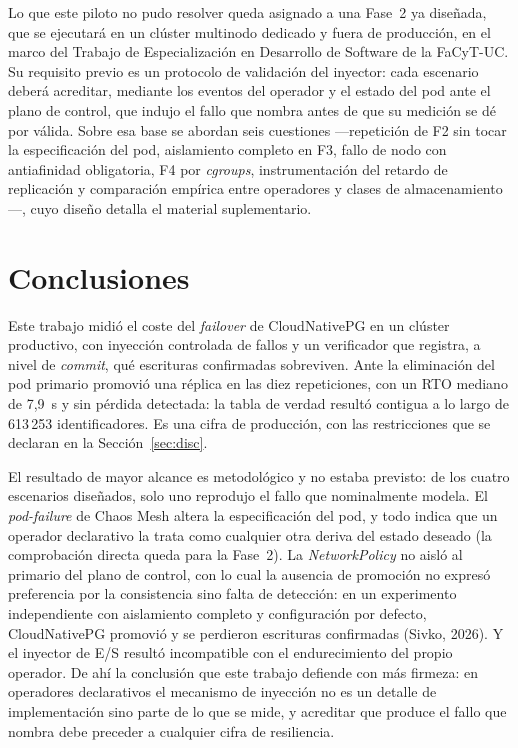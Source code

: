 \documentclass[12pt,twocolumn,letterpaper]{article}
\begin{document}
Lo que este piloto no pudo resolver queda asignado a una Fase~2 ya diseñada, que se ejecutará en un clúster multinodo dedicado y fuera de producción, en el marco del Trabajo de Especialización en Desarrollo de Software de la FaCyT-UC. Su requisito previo es un protocolo de validación del inyector: cada escenario deberá acreditar, mediante los eventos del operador y el estado del pod ante el plano de control, que indujo el fallo que nombra antes de que su medición se dé por válida. Sobre esa base se abordan seis cuestiones —repetición de F2 sin tocar la especificación del pod, aislamiento completo en F3, fallo de nodo con antiafinidad obligatoria, F4 por \textit{cgroups}, instrumentación del retardo de replicación y comparación empírica entre operadores y clases de almacenamiento—, cuyo diseño detalla el material suplementario.

\section{Conclusiones}\label{sec:concl}
Este trabajo midió el coste del \textit{failover} de CloudNativePG en un clúster productivo, con inyección controlada de fallos y un verificador que registra, a nivel de \textit{commit}, qué escrituras confirmadas sobreviven. Ante la eliminación del pod primario promovió una réplica en las diez repeticiones, con un RTO mediano de 7,9~s y sin pérdida detectada: la tabla de verdad resultó contigua a lo largo de 613\,253 identificadores. Es una cifra de producción, con las restricciones que se declaran en la Sección~\ref{sec:disc}.

El resultado de mayor alcance es metodológico y no estaba previsto: de los cuatro escenarios diseñados, solo uno reprodujo el fallo que nominalmente modela. El \textit{pod-failure} de Chaos Mesh altera la especificación del pod, y todo indica que un operador declarativo la trata como cualquier otra deriva del estado deseado (la comprobación directa queda para la Fase~2). La \textit{NetworkPolicy} no aisló al primario del plano de control, con lo cual la ausencia de promoción no expresó preferencia por la consistencia sino falta de detección: en un experimento independiente con aislamiento completo y configuración por defecto, CloudNativePG promovió y se perdieron escrituras confirmadas (Sivko, 2026). Y el inyector de E/S resultó incompatible con el endurecimiento del propio operador. De ahí la conclusión que este trabajo defiende con más firmeza: en operadores declarativos el mecanismo de inyección no es un detalle de implementación sino parte de lo que se mide, y acreditar que produce el fallo que nombra debe preceder a cualquier cifra de resiliencia.
\end{document}
